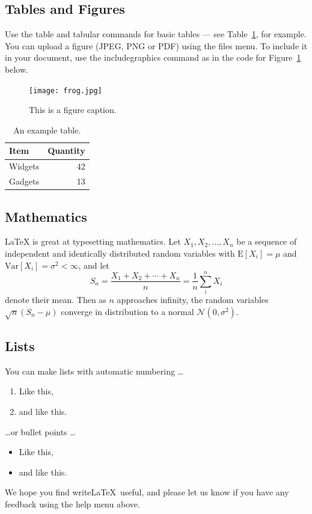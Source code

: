 
\subsection{Tables and Figures}

Use the table and tabular commands for basic tables --- see Table~\ref{tab:widgets}, for example. You can upload a figure (JPEG, PNG or PDF) using the files menu. To include it in your document, use the includegraphics command as in the code for Figure~\ref{fig:frog} below.

\begin{figure}
\centering
\texttt{[image: frog.jpg]}
\caption{\label{fig:frog}This is a figure caption.}
\end{figure}

\begin{table}
\centering
\begin{tabular}{l|r}
Item & Quantity \\\hline
Widgets & 42 \\
Gadgets & 13
\end{tabular}
\caption{\label{tab:widgets}An example table.}
\end{table}

\subsection{Mathematics}

\LaTeX{} is great at typesetting mathematics. Let $X_1, X_2, \ldots, X_n$ be a sequence of independent and identically distributed random variables with $\text{E}[X_i] = \mu$ and $\text{Var}[X_i] = \sigma^2 < \infty$, and let
$$S_n = \frac{X_1 + X_2 + \cdots + X_n}{n}
      = \frac{1}{n}\sum_{i}^{n} X_i$$
denote their mean. Then as $n$ approaches infinity, the random variables $\sqrt{n}(S_n - \mu)$ converge in distribution to a normal $\mathcal{N}(0, \sigma^2)$.

\subsection{Lists}

You can make lists with automatic numbering \dots

\begin{enumerate}
\item Like this,
\item and like this.
\end{enumerate}
\dots or bullet points \dots
\begin{itemize}
\item Like this,
\item and like this.
\end{itemize}

We hope you find write\LaTeX\ useful, and please let us know if you have any feedback using the help menu above.

